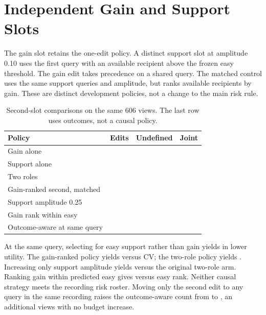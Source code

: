 \section{Independent Gain and Support Slots}

The gain slot retains the one-edit policy. A distinct
support slot at amplitude 0.10 uses the first query with
an available recipient above the frozen easy threshold.
The gain edit takes precedence on a shared query. The
matched control uses the same support queries and amplitude,
but ranks available recipients by gain. These are distinct
development policies, not a change to the main risk rule.

\begin{table}[h]
\centering
\caption{Second-slot comparisons on the same 606 views.
The last row uses outcomes, not a causal policy.}
\small
\begin{tabular}{lrrr}
\toprule
Policy & Edits & Undefined & Joint \\
\midrule
Gain alone & \TwoSupportGainEdits{} & \TwoSupportGainUndefined{} & \TwoSupportGainPass{} \\
Support alone & \TwoSupportSupportEdits{} & \TwoSupportSupportUndefined{} & \TwoSupportSupportPass{} \\
Two roles & \TwoSupportRolesEdits{} & \TwoSupportRolesUndefined{} & \TwoSupportRolesPass{} \\
Gain-ranked second, matched & \TwoSupportMatchEdits{} & \TwoSupportMatchUndefined{} & \TwoSupportMatchPass{} \\
Support amplitude 0.25 & \TwoSupportBiggerEdits{} & \TwoSupportBiggerUndefined{} & \TwoSupportBiggerPass{} \\
Gain rank within easy & \TwoSupportRerankEdits{} & \TwoSupportRerankUndefined{} & \TwoSupportRerankPass{} \\
Outcome-aware at same query & \TwoSupportOracleEdits{} & \TwoSupportOracleUndefined{} & \TwoSupportOraclePass{} \\
\bottomrule
\end{tabular}
\end{table}

At the same query, selecting for easy support rather than
gain yields \TwoSupportPrimary{} in lower utility. The
gain-ranked policy yields \TwoSupportMatch{} versus CV;
the two-role policy yields \TwoSupportRoles{}. Increasing
only support amplitude yields \TwoSupportBigger{} versus
the original two-role arm. Ranking gain within predicted
easy gives \TwoSupportRerank{} versus easy rank.
Neither causal strategy meets the recording risk roster.
Moving only the second edit to any query in the same
recording raises the outcome-aware count from
\TwoSupportOraclePass{} to \TwoSupportAnyTime{}, an additional
\TwoSupportExtraTime{} views with no budget increase.
